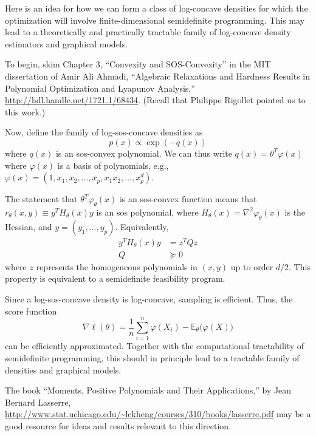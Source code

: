 \documentclass[12pt]{imsart}
\numberwithin{equation}{section}
\theoremstyle{plain}
\theoremstyle{remark}
\def\E{{\mathbb E}}
\let\phi\varphi
\def\E{{\mathbb E}}
\begin{document}
\begin{frontmatter}
\end{frontmatter}

\par


Here is an idea for how we can form a class of log-concave densities
for which the optimization will involve finite-dimensional
semidefinite programming.  This may lead to a
theoretically and practically tractable family 
of log-concave density estimators and graphical models.


To begin, skim Chapter 3, ``Convexity and SOS-Convexity'' in the MIT dissertation of 
Amir Ali Ahmadi, ``Algebraic Relaxations and Hardness Results
in Polynomial Optimization and Lyapunov Analysis,''
{\small \url{http://hdl.handle.net/1721.1/68434}}.
(Recall that Philippe Rigollet pointed us to this work.)

Now, define the family of log-sos-concave densities as 
\begin{equation}
p(x) \propto \exp\left(-q(x)\right)
\end{equation}
where $q(x)$ is an sos-convex polynomial.  
We can thus write $q(x) = \theta^T \phi(x)$ where $\phi(x)$ is a
basis of polynomials, e.g., $\phi(x) = (1,x_1,x_2,\ldots, x_p, x_1x_2,\ldots, x_p^{d})$. 

The statement that 
$\theta^T \phi_\theta(x)$ is an sos-convex function
means that $r_\theta(x,y) \equiv y^T H_\theta(x) y$ is an sos polynomial, 
where $H_\theta(x) = \nabla^2 \phi_\theta(x)$ is the Hessian,
and $y=(y_1,\ldots, y_p)$.  Equivalently, 
\begin{align}
y^T H_\theta(x) y & = z^T Q z \\
Q & \succeq 0
\end{align}
where $z$ represents the homogeneous polynomials in $(x,y)$ up to
order $d/2$. This property is equivalent to a semidefinite feasibility program.

Since a log-sos-concave density is log-concave, sampling is efficient.
Thus, the score function
\begin{equation}
\nabla \ell(\theta) = \frac{1}{n} \sum_{i=1}^n \phi(X_i) - \E_\theta\bigl(\phi(X)\bigr)
\end{equation}
can be efficiently approximated. Together with the computational 
tractability of semidefinite programming, this should
in principle lead to a tractable family of densities and
graphical models. 

The book ``Moments, Positive Polynomials and Their Applications,'' by Jean
Bernard Lasserre,
{\small\url{http://www.stat.uchicago.edu/~lekheng/courses/310/books/lasserre.pdf}}
may be a good resource for ideas and results relevant to this direction.
\end{document}
